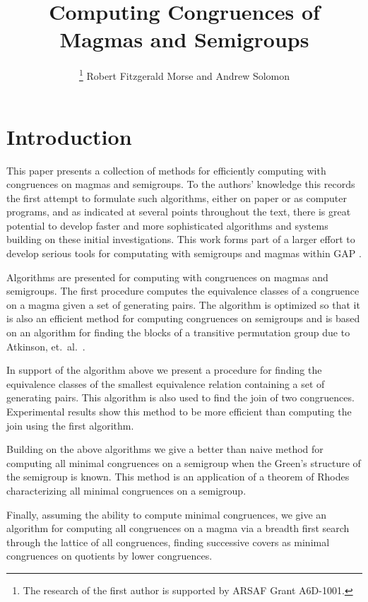 \documentclass{acmconf}
\author{ 
\thanks{The research of 
the first author is supported by ARSAF Grant A6D-1001.}
Robert Fitzgerald Morse 
and  Andrew Solomon}
\title{Computing Congruences of Magmas and Semigroups}
\affiliation{Department of Electrical Engineering and Computer Science\\
         University of Evansville\\
         Evansville, Indiana, 47722 USA\\ \vspace{0.5cm}
         Department of Computer Science\\ \vspace{0.15cm}
         University of St. Andrews,
         Fife KY16 9SS, United Kingdom}
\def\gap{\sf GAP}
\begin{document}
\maketitle
\renewcommand{\algorithmicrequire}{\textbf{Input:}}
\renewcommand{\algorithmicensure}{\textbf{Output:}}

\section{Introduction} \label{S:intro}
This paper presents a collection of methods for efficiently computing with 
congruences on magmas and semigroups. To the authors' knowledge
this records the first attempt to formulate such algorithms, either on paper
or as computer programs, and as indicated at several points throughout
the text, there is great potential to develop faster and more sophisticated 
algorithms and systems building on these initial investigations.
This work forms part of a larger effort \cite{pAS99}
to develop serious tools for computating with semigroups and magmas
within {\gap} \cite{gap}.

Algorithms are presented  for computing with congruences
on magmas and semigroups. The first procedure computes the equivalence 
classes of a congruence on a magma given a set of generating pairs.
The algorithm is optimized so that it is also 
an efficient method for computing congruences  on semigroups and
is based on an algorithm for finding the blocks of 
a transitive permutation group due to Atkinson, et.~al.~\cite{pA84}. 

In support of the algorithm above we present a procedure for
finding the equivalence classes of the smallest equivalence relation 
containing a
set of generating pairs. This algorithm is  also used to find the join
of two congruences. Experimental results show this method to be more
efficient than computing the join using the first algorithm.  

Building on the above algorithms  we give a better than naive method
for computing all minimal congruences on a semigroup when the 
Green's structure of the semigroup is known. This method
is an application of a theorem of Rhodes \cite{pR67} characterizing
all minimal congruences on a semigroup.

Finally, assuming the ability to compute minimal congruences,
we give an algorithm for computing all congruences on a magma
via a breadth first search through the lattice of all congruences,
finding successive covers as minimal congruences on quotients by
lower congruences.
\end{document}
